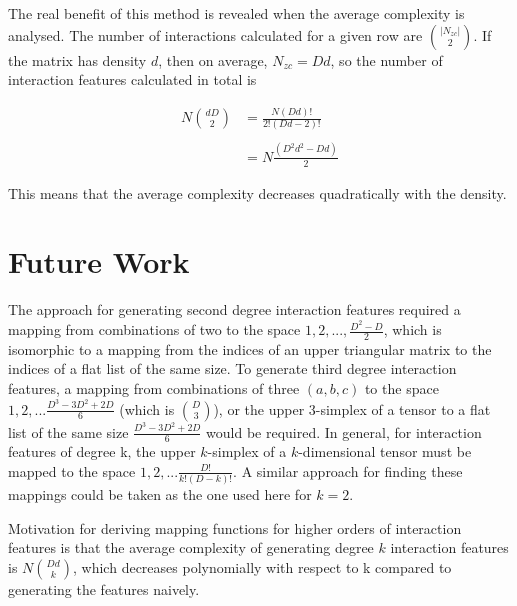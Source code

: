 \documentclass[11pt]{article}
\begin{document}
The real benefit of this method is revealed when the average complexity is analysed. The 
number of interactions calculated for a given row are $\binom{|N_{zc}|}{2}$. If the matrix has 
density $d$, then on average, $N_{zc} = D d$, so the number of interaction features 
calculated in total is 

\begin{align*}
N \binom{d D}{2} &= \frac{N (Dd)!}{2!(Dd-2)!}\\
    \\
    &= N \frac{(D^2d^2-Dd)}{2}
\end{align*}

This means that the average complexity decreases quadratically with the density.

\section{Future Work}
The approach for generating second degree interaction features required a mapping from 
combinations of two to the space $1,2,...,\frac{D^2-D}{2}$, which is isomorphic to a mapping from 
the indices of an upper triangular matrix to the indices of a flat list of the same size. 
To generate third degree interaction features, a mapping from combinations of three 
$(a,b,c)$ to the space $1,2,...\frac{D^3-3D^2+2D}{6}$ (which is $\binom{D}{3}$), or the upper $3$-simplex of a tensor to a flat 
list of the same size $\frac{D^3-3D^2+2D}{6}$ would be required. In general, for interaction 
features of degree k, the upper $k$-simplex of a $k$-dimensional tensor must be mapped to the 
space $1,2,...\frac{D!}{k!(D-k)!}$. A similar approach for finding these mappings could be taken 
as the one used here for $k=2$. 

Motivation for deriving mapping functions for higher orders
of interaction features is that the average complexity of generating degree $k$ interaction
features is $N \binom{Dd}{k}$, which decreases polynomially with respect to k compared to
generating the features naively.

    
\vskip 0.2in

\end{document}
